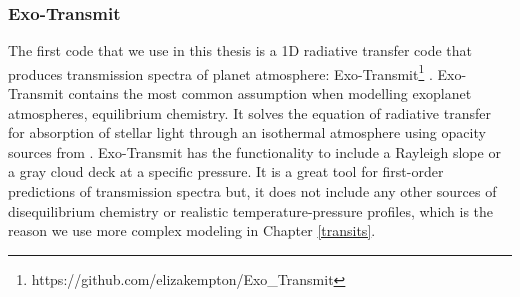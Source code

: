 


\subsubsection{Exo-Transmit}

The first code that we use in this thesis is a 1D radiative transfer code that produces transmission spectra of planet atmosphere: Exo-Transmit\footnote{https://github.com/elizakempton/Exo\_Transmit} \citep{Kempton2017a}. Exo-Transmit contains the most common assumption when modelling exoplanet atmospheres, equilibrium chemistry. It solves the equation of radiative transfer for absorption of stellar light through an isothermal atmosphere using opacity sources from \citet{Freedman2008,Lupu2014}. Exo-Transmit has the functionality to include a Rayleigh slope or a gray cloud deck at a specific pressure. It is a great tool for first-order predictions of transmission spectra but, it does not include any other sources of disequilibrium chemistry or realistic temperature-pressure profiles, which is the reason we use more complex modeling in Chapter \ref{transits}.

